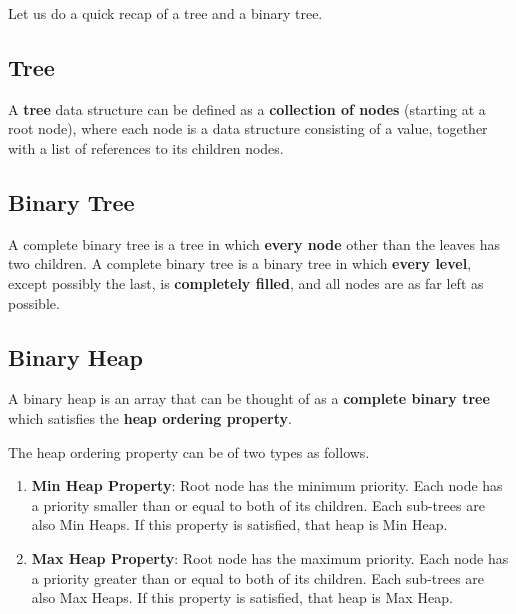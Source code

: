 Let us do a quick recap of a tree and a binary tree.

\subsection{Tree}
A \textbf{tree} data structure can be defined as a \textbf{collection of nodes} (starting at a root node), where each node is a data structure consisting of a value, together with a list of references to its children nodes.

\subsection{Binary Tree}
A complete binary tree is a tree in which \textbf{every node} other than the leaves has two children. A complete binary tree is a binary tree in which \textbf{every level}, except possibly the last, is \textbf{completely filled}, and all nodes are as far left as possible.

\subsection{Binary Heap}
A binary heap is an array that can be thought of as a \textbf{complete binary tree} which satisfies the \textbf{heap ordering property}.


The heap ordering property can be of two types as follows.
\begin{enumerate}
    \item \textbf{Min Heap Property}: Root node has the minimum priority. Each node has a priority smaller than or equal to both of its children. Each sub-trees are also Min Heaps. If this property is satisfied, that heap is Min Heap.
    \item \textbf{Max Heap Property}: Root node has the maximum priority. Each node has a priority greater than or equal to both of its children. Each sub-trees are also Max Heaps. If this property is satisfied, that heap is Max Heap.
\end{enumerate}
